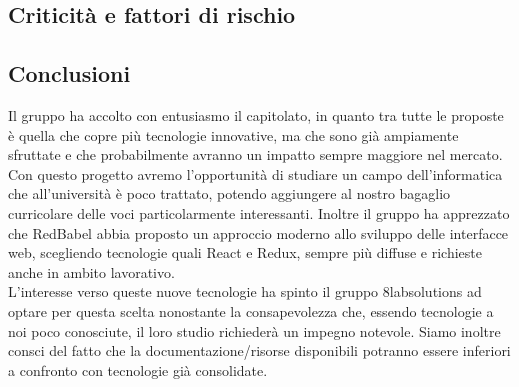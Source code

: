 \subsection{Criticità e fattori di rischio}

\subsection{Conclusioni} Il gruppo ha accolto con entusiasmo il capitolato, in quanto tra tutte le proposte è quella che copre più tecnologie innovative, ma che sono già ampiamente sfruttate e che probabilmente avranno un impatto sempre maggiore nel mercato. Con questo progetto avremo l'opportunità di studiare un campo dell'informatica che all'università è poco trattato, potendo aggiungere al nostro bagaglio curricolare delle voci particolarmente interessanti. Inoltre il gruppo ha apprezzato che RedBabel abbia proposto un approccio moderno allo sviluppo delle interfacce web, scegliendo tecnologie quali React e Redux, sempre più diffuse e richieste anche in ambito lavorativo.\\
 L'interesse verso queste nuove tecnologie ha spinto il gruppo 8labsolutions ad optare per questa scelta nonostante la consapevolezza che, essendo tecnologie a noi poco conosciute, il loro studio richiederà un impegno notevole. Siamo inoltre consci del fatto che la documentazione/risorse disponibili potranno essere inferiori a confronto con tecnologie già consolidate.